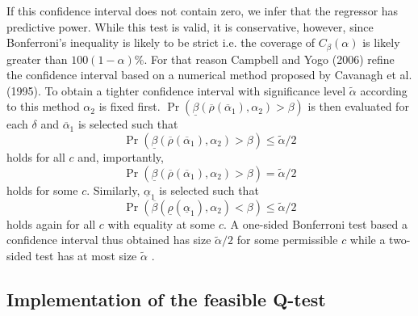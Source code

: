 \documentclass{article}
\begin{document}
If this confidence interval does not contain zero, we infer that the regressor has predictive power. While this test is valid, it is conservative, however, since Bonferroni's inequality is likely to be strict i.e. the coverage of $C_{\beta}(\alpha)$ is likely greater than $100(1-\alpha) \%$. For that reason Campbell and Yogo (2006) refine the confidence interval based on a numerical method proposed by Cavanagh et al. (1995). To obtain a tighter confidence interval with significance level $\widetilde{\alpha}$ according to this method $\alpha_{2}$ is fixed first. $\operatorname{Pr}\left(\underline{\beta}\left(\overline{\rho}\left(\overline{\alpha}_{1}\right), \alpha_{2}\right)>\beta\right)$ is then evaluated for each $\delta$ and $\overline{\alpha}_{1}$ is selected such that 
\begin{equation}
\operatorname{Pr}\left(\underline{\beta}\left(\overline{\rho}\left(\overline{\alpha}_{1}\right),\alpha_{2}\right)>\beta\right) \leq \widetilde{\alpha} / 2\end{equation}
holds for all $c$ and, importantly,
\begin{equation}
\operatorname{Pr}\left(\underline{\beta}\left(\overline{\rho}\left(\overline{\alpha}_{1}\right), \alpha_{2}\right)>\beta\right) = \widetilde{\alpha} / 2
\end{equation}
holds for some $c$. 
Similarly, $\underline{\alpha}_{1}$ is selected such that 
\begin{equation}
\operatorname{Pr}\left(\overline{\beta}\left(\underline{\rho}\left(\underline{\alpha}_{1}\right), \alpha_{2}\right)<\beta\right) \leq \widetilde{\alpha} / 2
\end{equation}
holds again for all $c$ with equality at some $c$. A one-sided Bonferroni test based a confidence interval thus obtained has size $\widetilde{\alpha} / 2$ for some permissible $c$ while a two-sided test has at most size  $\widetilde{\alpha}$ .  

\subsection{Implementation of the feasible Q-test}
\label{implementation}
\end{document}
